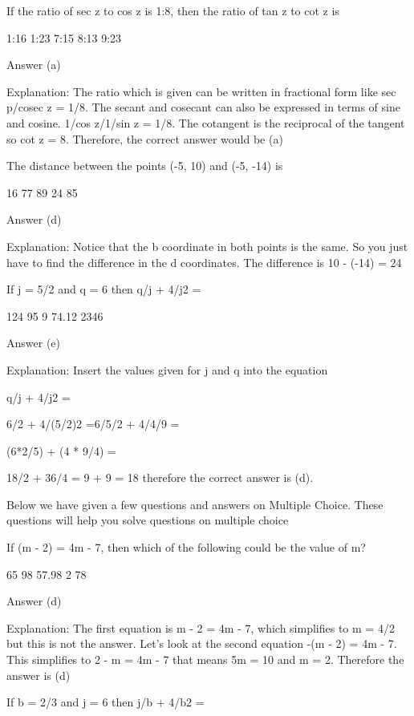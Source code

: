    If the ratio of sec z to cos z is 1:8, then the ratio of tan z to cot z is

        1:16
        1:23
        7:15
        8:13
        9:23 

    Answer (a)

    Explanation: The ratio which is given can be written in fractional form like sec p/cosec z = 1/8. The secant and cosecant can also be expressed in terms of sine and cosine. 1/cos z/1/sin z = 1/8. The cotangent is the reciprocal of the tangent so cot z = 8. Therefore, the correct answer would be (a)

    The distance between the points (-5, 10) and (-5, -14) is

        16
        77
        89
        24
        85 

    Answer (d)

    Explanation: Notice that the b coordinate in both points is the same. So you just have to find the difference in the d coordinates. The difference is 10 - (-14) = 24

    If j = 5/2 and q = 6 then q/j + 4/j2 =

        124
        95
        9
        74.12
        2346 

    Answer (e)

    Explanation: Insert the values given for j and q into the equation

    q/j + 4/j2 =

    6/2 + 4/(5/2)2 =6/5/2 + 4/4/9 =

    (6*2/5) + (4 * 9/4) =

    18/2 + 36/4 = 9 + 9 = 18 therefore the correct answer is (d). 


Below we have given a few questions and answers on Multiple Choice. These questions will help you solve questions on multiple choice

    If (m - 2) = 4m - 7, then which of the following could be the value of m?

        65
        98
        57.98
        2
        78 

    Answer (d)

    Explanation: The first equation is m - 2 = 4m - 7, which simplifies to m = 4/2 but this is not the answer. Let's look at the second equation -(m - 2) = 4m - 7. This simplifies to 2 - m = 4m - 7 that means 5m = 10 and m = 2. Therefore the answer is (d)

    If b = 2/3 and j = 6 then j/b + 4/b2 =

